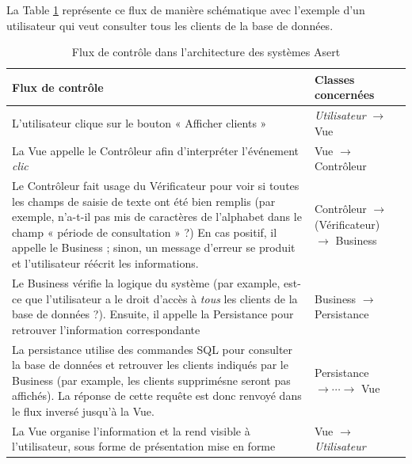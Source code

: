 La Table \ref{flux} représente ce flux de manière schématique avec l'exemple d'un utilisateur qui veut consulter tous les clients de la base de données.

\begin{table}[ht]
\begin{center}
    \begin{tabular}{ | p{8.5cm} | p{5cm} |}
    \hline
    \textbf{Flux de contrôle} & \textbf{Classes concernées} \\ \hline
    L'utilisateur clique sur le bouton « Afficher clients »  & \textit{Utilisateur} $\rightarrow$ Vue \\ \hline
    La Vue appelle le Contrôleur afin d'interpréter l'événement \textit{clic} & Vue $\rightarrow$ Contrôleur \\ \hline
    Le Contrôleur fait usage du Vérificateur pour voir si toutes les champs de saisie de texte ont été bien remplis 
    	(par exemple, n'a-t-il pas mis de caractères de l'alphabet dans le champ « période de consultation » ?)
    	En cas positif, il appelle le Business ; sinon, un message d'erreur se produit et l'utilisateur réécrit les informations. 
    	& Contrôleur $\rightarrow$ (Vérificateur) $\rightarrow$ Business \\ \hline
    Le Business vérifie la logique du système (par example, est-ce que l'utilisateur a le droit d'accès à 
    \textit{tous} les clients de la base de données ?).
    	Ensuite, il appelle la Persistance pour retrouver l'information correspondante
    	& Business  $\rightarrow$ Persistance \\ \hline
    La persistance utilise des commandes SQL pour consulter la base de données et retrouver les clients indiqués par le Business 
    	(par example, les clients supprimés\footnotemark[1] ne seront pas affichés). 
    	La réponse de cette requête est donc renvoyé dans le flux inversé jusqu'à la Vue. 
    	& Persistance $\rightarrow \cdots \rightarrow$ Vue \\ \hline
    La Vue organise l'information et la rend visible à l'utilisateur, sous forme de présentation mise en forme 
    	& Vue $\rightarrow$ \textit{Utilisateur} \\
    \hline
    \end{tabular}
\end{center}
\caption{Flux de contrôle dans l'architecture des systèmes Asert}\label{flux}
\end{table}
